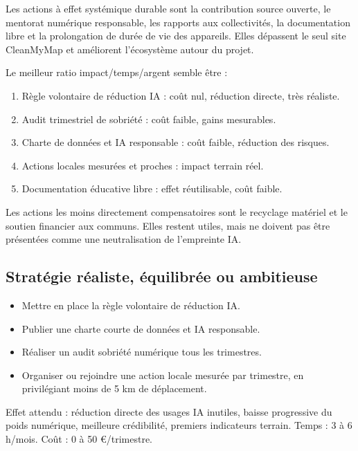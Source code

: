 \documentclass[
  10pt,
  a4paper,
  DIV=11,
  numbers=noendperiod,
  oneside]{scrreprt}
\providecommand{\tightlist}{%
  \setlength{\itemsep}{0pt}\setlength{\parskip}{0pt}}
\begin{document}
Les actions à effet systémique durable sont la contribution source
ouverte, le mentorat numérique responsable, les rapports aux
collectivités, la documentation libre et la prolongation de durée de vie
des appareils. Elles dépassent le seul site CleanMyMap et améliorent
l'écosystème autour du projet.

Le meilleur ratio impact/temps/argent semble être :

\begin{enumerate}
\def\labelenumi{\arabic{enumi}.}
\tightlist
\item
  Règle volontaire de réduction IA : coût nul, réduction directe, très
  réaliste.
\item
  Audit trimestriel de sobriété : coût faible, gains mesurables.
\item
  Charte de données et IA responsable : coût faible, réduction des
  risques.
\item
  Actions locales mesurées et proches : impact terrain réel.
\item
  Documentation éducative libre : effet réutilisable, coût faible.
\end{enumerate}

Les actions les moins directement compensatoires sont le recyclage
matériel et le soutien financier aux communs. Elles restent utiles, mais
ne doivent pas être présentées comme une neutralisation de l'empreinte
IA.

\subsection{Stratégie réaliste, équilibrée ou
ambitieuse}\label{stratuxe9gie-ruxe9aliste-uxe9quilibruxe9e-ou-ambitieuse}

\begin{itemize}
\tightlist
\item
  Mettre en place la règle volontaire de réduction IA.
\item
  Publier une charte courte de données et IA responsable.
\item
  Réaliser un audit sobriété numérique tous les trimestres.
\item
  Organiser ou rejoindre une action locale mesurée par trimestre, en
  privilégiant moins de 5 km de déplacement.
\end{itemize}

Effet attendu : réduction directe des usages IA inutiles, baisse
progressive du poids numérique, meilleure crédibilité, premiers
indicateurs terrain. Temps : 3 à 6 h/mois. Coût : 0 à 50 €/trimestre.
\end{document}
